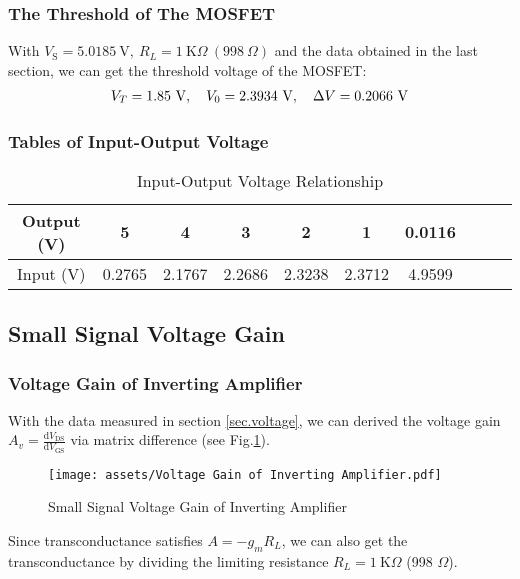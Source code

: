 \documentclass[UTF8]{report}
\def\KO{\ \mathrm{K}\Omega}
\theoremstyle{MyLineTheoremStyle} %
\theoremstyle{MyBlockTheoremStyle} %
\theoremstyle{MySubsubsectionStyle} %
\begin{document}
\subsubsection{The Threshold of The MOSFET}
With $V_\text{S} = 5.0185 \ \mathrm{V},\ R_L = 1 \KO\ (998\ \Omega)$ and the data obtained in the last section, we can get the threshold voltage of the MOSFET:
\begin{gather}
\boldmath
V_T = 1.85 \ \mathrm{V},\quad V_0 = 2.3934 \ \mathrm{V},\quad \Delta V = 0.2066 \ \mathrm{V}
\end{gather}

\subsubsection{Tables of Input-Output Voltage}
\begin{table}[H]\centering
    \caption{Input-Output Voltage Relationship}
    \label{Input-Output Voltage Relationship}
\begin{tabular}{cccccccccc}\toprule
    Output (V) & 5 & 4 & 3 & 2 & 1 & 0.0116\\
    \midrule
    Input (V) & 0.2765 & 2.1767 & 2.2686 & 2.3238 & 2.3712 & 4.9599 \\
    \bottomrule
\end{tabular}
\end{table}


\subsection{Small Signal Voltage Gain}
\subsubsection{Voltage Gain of Inverting Amplifier}\label{sec.voltage gain}
With the data measured in section \ref{sec.voltage}, we can derived the voltage gain $A_v = \frac{\mathrm{d} V_\text{DS} }{\mathrm{d} V_\text{GS} }$ via matrix difference (see Fig.\ref{Voltage Gain}).
\begin{figure}[H]\centering
    \texttt{[image: assets/Voltage Gain of Inverting Amplifier.pdf]}
    \caption{Small Signal Voltage Gain of Inverting Amplifier}
    \label{Voltage Gain}
\end{figure}
Since transconductance satisfies $A = -g_m R_L$, we can also get the transconductance by dividing the limiting resistance $R_L = 1 \KO$ (998 $\Omega$).
\end{document}
